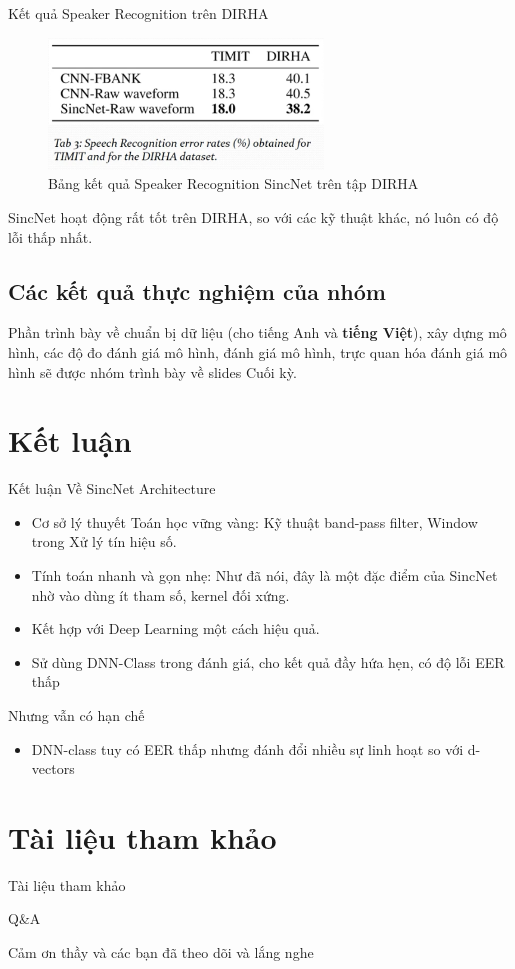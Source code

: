 \documentclass[11pt]{beamer}
\begin{document}
\begin{frame}{Kết quả Speaker Recognition trên DIRHA}
	\begin{figure}[H]
		\centering
		\includegraphics[width=0.65\textwidth]{images/sr_sincnet_result.png}
		\caption{Bảng kết quả Speaker Recognition SincNet trên tập DIRHA}
		\label{fig:writing-thesis}
	\end{figure}
	SincNet hoạt động rất tốt trên DIRHA, so với các kỹ thuật khác, nó luôn có độ lỗi thấp nhất.	
\end{frame}
\subsection{Các kết quả thực nghiệm của nhóm}
\begin{frame}
	Phần trình bày về chuẩn bị dữ liệu (cho tiếng Anh và \textbf{tiếng Việt}), xây dựng mô hình, các độ đo đánh giá mô hình, đánh giá mô hình, trực quan hóa đánh giá mô hình sẽ được nhóm trình bày về slides Cuối kỳ.
\end{frame}

\section{Kết luận}
\begin{frame}{Kết luận}
	Về SincNet Architecture
	\begin{itemize}
		\item Cơ sở lý thuyết Toán học vững vàng: Kỹ thuật band-pass filter, Window trong Xử lý tín hiệu số.
		\item Tính toán nhanh và gọn nhẹ: Như đã nói, đây là một đặc điểm của SincNet nhờ vào dùng ít tham số, kernel đối xứng.
		\item Kết hợp với Deep Learning một cách hiệu quả.
		\item Sử dùng DNN-Class trong đánh giá, cho kết quả đầy hứa hẹn, có độ lỗi EER thấp
	\end{itemize}
	Nhưng vẫn có hạn chế
	\begin{itemize}
		\item DNN-class tuy có EER thấp nhưng đánh đổi nhiều sự linh hoạt so với d-vectors
	\end{itemize}
\end{frame}


\section{Tài liệu tham khảo}
\begin{frame}{Tài liệu tham khảo}
	\nocite{*}
	\newpage\cleardoublepage
	
\end{frame}


\begin{frame}{Q\&A}
	\begin{center}
		\Huge Cảm ơn thầy và các bạn đã theo dõi và lắng nghe
	\end{center}
\end{frame}
\end{document}
